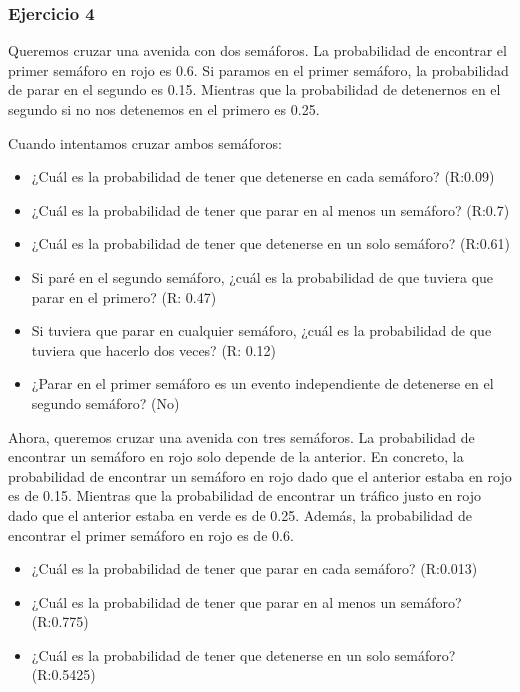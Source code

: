 \documentclass[
]{book}
\providecommand{\tightlist}{%
  \setlength{\itemsep}{0pt}\setlength{\parskip}{0pt}}
\begin{document}
\hypertarget{ejercicio-4}{%
\subsubsection{Ejercicio 4}\label{ejercicio-4}}

Queremos cruzar una avenida con dos semáforos. La probabilidad de encontrar el primer semáforo en rojo es 0.6. Si paramos en el primer semáforo, la probabilidad de parar en el segundo es 0.15. Mientras que la probabilidad de detenernos en el segundo si no nos detenemos en el primero es 0.25.

Cuando intentamos cruzar ambos semáforos:

\begin{itemize}
\tightlist
\item
  ¿Cuál es la probabilidad de tener que detenerse en cada semáforo? (R:0.09)
\item
  ¿Cuál es la probabilidad de tener que parar en al menos un semáforo? (R:0.7)
\item
  ¿Cuál es la probabilidad de tener que detenerse en un solo semáforo? (R:0.61)
\item
  Si paré en el segundo semáforo, ¿cuál es la probabilidad de que tuviera que parar en el primero? (R: 0.47)
\item
  Si tuviera que parar en cualquier semáforo, ¿cuál es la probabilidad de que tuviera que hacerlo dos veces? (R: 0.12)
\item
  ¿Parar en el primer semáforo es un evento independiente de detenerse en el segundo semáforo? (No)
\end{itemize}

Ahora, queremos cruzar una avenida con tres semáforos. La probabilidad de encontrar un semáforo en rojo solo depende de la anterior. En concreto, la probabilidad de encontrar un semáforo en rojo dado que el anterior estaba en rojo es de 0.15. Mientras que la probabilidad de encontrar un tráfico justo en rojo dado que el anterior estaba en verde es de 0.25. Además, la probabilidad de encontrar el primer semáforo en rojo es de 0.6.

\begin{itemize}
\tightlist
\item
  ¿Cuál es la probabilidad de tener que parar en cada semáforo? (R:0.013)
\item
  ¿Cuál es la probabilidad de tener que parar en al menos un semáforo? (R:0.775)
\item
  ¿Cuál es la probabilidad de tener que detenerse en un solo semáforo? (R:0.5425)
\end{itemize}
\end{document}
